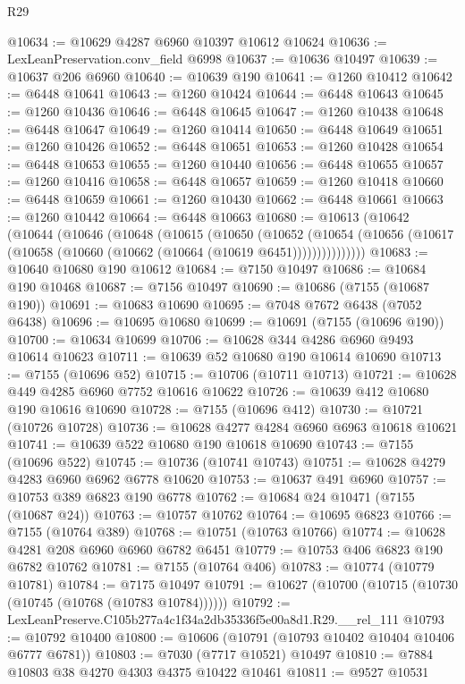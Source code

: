 \begin{lexlean}{R29}
\begin{coremodule}
@10634 := @10629 @4287 @6960 @10397 @10612 @10624
@10636 := LexLeanPreservation.conv_field @6998
@10637 := @10636 @10497
@10639 := @10637 @206 @6960
@10640 := @10639 @190
@10641 := @1260 @10412
@10642 := @6448 @10641
@10643 := @1260 @10424
@10644 := @6448 @10643
@10645 := @1260 @10436
@10646 := @6448 @10645
@10647 := @1260 @10438
@10648 := @6448 @10647
@10649 := @1260 @10414
@10650 := @6448 @10649
@10651 := @1260 @10426
@10652 := @6448 @10651
@10653 := @1260 @10428
@10654 := @6448 @10653
@10655 := @1260 @10440
@10656 := @6448 @10655
@10657 := @1260 @10416
@10658 := @6448 @10657
@10659 := @1260 @10418
@10660 := @6448 @10659
@10661 := @1260 @10430
@10662 := @6448 @10661
@10663 := @1260 @10442
@10664 := @6448 @10663
@10680 := @10613
    (@10642
      (@10644
        (@10646
          (@10648
            (@10615
              (@10650
                (@10652
                  (@10654
                    (@10656 (@10617 (@10658 (@10660 (@10662 (@10664 (@10619 @6451)))))))))))))))
@10683 := @10640 @10680 @190 @10612
@10684 := @7150 @10497
@10686 := @10684 @190 @10468
@10687 := @7156 @10497
@10690 := @10686 (@7155 (@10687 @190))
@10691 := @10683 @10690
@10695 := @7048 @7672 @6438 (@7052 @6438)
@10696 := @10695 @10680
@10699 := @10691 (@7155 (@10696 @190))
@10700 := @10634 @10699
@10706 := @10628 @344 @4286 @6960 @9493 @10614 @10623
@10711 := @10639 @52 @10680 @190 @10614 @10690
@10713 := @7155 (@10696 @52)
@10715 := @10706 (@10711 @10713)
@10721 := @10628 @449 @4285 @6960 @7752 @10616 @10622
@10726 := @10639 @412 @10680 @190 @10616 @10690
@10728 := @7155 (@10696 @412)
@10730 := @10721 (@10726 @10728)
@10736 := @10628 @4277 @4284 @6960 @6963 @10618 @10621
@10741 := @10639 @522 @10680 @190 @10618 @10690
@10743 := @7155 (@10696 @522)
@10745 := @10736 (@10741 @10743)
@10751 := @10628 @4279 @4283 @6960 @6962 @6778 @10620
@10753 := @10637 @491 @6960
@10757 := @10753 @389 @6823 @190 @6778
@10762 := @10684 @24 @10471 (@7155 (@10687 @24))
@10763 := @10757 @10762
@10764 := @10695 @6823
@10766 := @7155 (@10764 @389)
@10768 := @10751 (@10763 @10766)
@10774 := @10628 @4281 @208 @6960 @6960 @6782 @6451
@10779 := @10753 @406 @6823 @190 @6782 @10762
@10781 := @7155 (@10764 @406)
@10783 := @10774 (@10779 @10781)
@10784 := @7175 @10497
@10791 := @10627 (@10700 (@10715 (@10730 (@10745 (@10768 (@10783 @10784))))))
@10792 := LexLeanPreserve.C105b277a4c1f34a2db35336f5e00a8d1.R29.__rel_111
@10793 := @10792 @10400
@10800 := @10606 (@10791 (@10793 @10402 @10404 @10406 @6777 @6781))
@10803 := @7030 (@7717 @10521) @10497
@10810 := @7884 @10803 @38 @4270 @4303 @4375 @10422 @10461
@10811 := @9527 @10531

\end{coremodule}
\end{lexlean}
